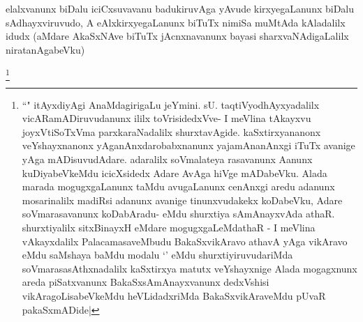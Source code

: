 
\begin{artha}
elalxvanunx biDalu iciCxsuvavanu badukiruvAga yAvude kirxyegaLanunx biDalu sAdhayxviruvudo, A eAlxkirxyegaLanunx biTuTx nimiSa muMtAda kAladalilx idudx (aMdare AkaSxNAve biTuTx jAcnxnavanunx bayasi sharxvaNAdigaLalilx niratanAgabeVku)
\end{artha}

\begin{artha}
\footnote{``\stext" itAyxdiyAgi AnaMdagirigaLu jeYmini. sU. taqtiVyodhAyxyadalilx vicARamADiruvudanunx ililx toVrisidedxVve- I meVlina tAkayxvu joyxVtiSoTxVma parxkaraNadalilx shurxtavAgide. kaSxtirxyananonx veYshayxnanonx yAganAnxdarobabxnanunx yajamAnanAnxgi iTuTx avanige yAga mADisuvudAdare. adaralilx soVmalateya rasavanunx Aanunx kuDiyabeVkeMdu icicXsidedx Adare AvAga hiVge mADabeVku. Alada marada mogugxgaLanunx taMdu avugaLanunx cenAnxgi aredu adanunx mosarinalilx madiRsi adanunx avanige tinunxvudakekx koDabeVku, Adare soVmarasavanunx koDabAradu- eMdu shurxtiya sAmAnayxvAda athaR. shurxtiyalilx sitxBinayxH eMdare mogugxgaLeMdathaR - I meVlina vAkayxdalilx PalacamasaveMbudu BakaSxvikAravo athavA yAga vikAravo eMdu saMshaya baMdu modalu `\stext' eMdu shurxtiyiruvudariMda soVmarasasAthxnadalilx kaSxtirxya matutx veYshayxnige Alada mogagxnunx areda piSatxvanunx BakaSxsAmAnayxvanunx dedxVshisi vikAragoLisabeVkeMdu heVLidadxriMda BakaSxvikAraveMdu pUvaR pakaSxmADide|}
\end{artha}


